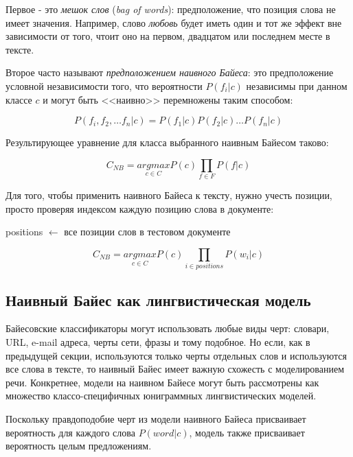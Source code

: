 \documentclass[a4paper,12pt,preview]{report} %
\begin{document}
	Первое - это \textit{мешок слов} (\textit{bag of words}): предположение, что позиция слова не имеет значения. Например, слово \textit{любовь} будет иметь один и тот же эффект вне зависимости от того, чтоит оно на первом, двадцатом или последнем месте в тексте.
	
	Второе часто называют \textit{предположением наивного Байеса}:
	это предположение условной независимости того, что вероятности $P(f_i | c)$ независимы при данном классе $c$ и могут быть <<наивно>> перемножены таким способом:
	
	\begin{equation}
		P(f_i, f_2, \dots f_n | c) = P(f_1 | c) P(f_2 | c) \dots P(f_n | c)
	\end{equation}
	
	Результирующее уравнение для класса выбранного наивным Байесом таково:
	
	\begin{equation}
		C_{NB} = \underset{c \in C}{argmax} P(c) \underset{f \in F}{\prod} P(f | c)
	\end{equation}
	
	Для того, чтобы применить наивного Байеса к тексту, нужно учесть позиции, просто проверяя индексом каждую позицию слова в документе:
	
	\begin{center}
	positions $\leftarrow$ все позиции слов в тестовом документе
	\end{center}
	\begin{equation}	
	C_{NB} = \underset{c \in C}{argmax} P(c) \underset{i \in positions}{\prod} P(w_i | c)
	\end{equation}
	
	 
	 \subsection{Наивный Байес как лингвистическая модель}
	 
	 Байесовские классификаторы могут использовать любые виды черт: словари, URL, e-mail адреса, черты сети, фразы и тому подобное. Но если, как в предыдущей секции, используются только черты отдельных слов и используются все слова в тексте, то наивный Байес имеет важную схожесть с моделированием речи. Конкретнее, модели на наивном Байесе могут быть рассмотрены как множество классо-специфичных юниграммных лингвистических моделей.
	 
	 Поскольку  правдоподобие черт из модели наивного Байеса присваивает вероятность для каждого слова $P(word | c)$, модель также присваивает вероятность целым предложениям.
	 
\end{document}
